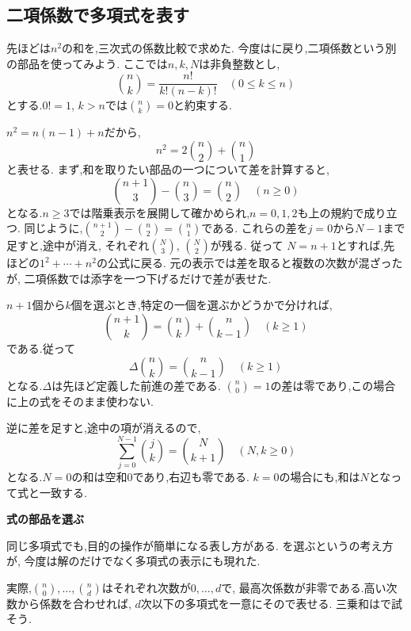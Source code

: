 \subsection{二項係数で多項式を表す}\label{節：二項係数と差分}
  先ほどは$n^2$の和を,三次式の係数比較で求めた.
  今度はに戻り,二項係数という別の部品を使ってみよう.
  ここでは$n,k,N$は非負整数とし,
  \[
    \binom nk=\frac{n!}{k!(n-k)!}\quad(0\le k\le n)
  \]
  とする.$0!=1$, $k>n$では$\binom nk=0$と約束する.

  $n^2=n(n-1)+n$だから,
  \[
    n^2=2\binom n2+\binom n1
  \]
  と表せる.
  まず,和を取りたい部品の一つについて差を計算すると,
  \[
    \binom{n+1}{3}-\binom n3=\binom n2\quad(n\ge0)
  \]
  となる.$n\ge3$では階乗表示を展開して確かめられ,$n=0,1,2$も上の規約で成り立つ.
  同じように,$\binom{n+1}{2}-\binom n2=\binom n1$である.
  これらの差を$j=0$から$N-1$まで足すと,途中が消え,
  それぞれ$\binom N3$, $\binom N2$が残る.
  従って
  \BookMathLayout{\[
    \sum_{j=0}^{N-1}j^2=2\binom N3+\binom N2
     =\frac{N(N-1)(2N-1)}6.
  \]}{\[
    \begin{aligned}
      \sum_{j=0}^{N-1}j^2&=2\binom N3+\binom N2\\
      &=\frac{N(N-1)(2N-1)}6.
    \end{aligned}
  \]}
  $N=n+1$とすれば,先ほどの$1^2+\cdots+n^2$の公式に戻る.
  元の表示では差を取ると複数の次数が混ざったが,
  二項係数では添字を一つ下げるだけで差が表せた.

  $n+1$個から$k$個を選ぶとき,特定の一個を選ぶかどうかで分ければ,
  \[
    \binom{n+1}{k}=\binom nk+\binom n{k-1}\quad(k\ge1)
  \]
  である.従って
  \[
    \Delta\binom nk=\binom n{k-1}\quad(k\ge1)
  \]
  となる.$\Delta$は先ほど定義した前進の差である.
  $\binom n0=1$の差は零であり,この場合に上の式をそのまま使わない.

  逆に差を足すと,途中の項が消えるので,
  \[
    \sum_{j=0}^{N-1}\binom jk=\binom N{k+1}
    \quad(N,k\ge0)
  \]
  となる.$N=0$の和は空和$0$であり,右辺も零である.
  $k=0$の場合にも,和は$N$となって式と一致する.
  \BookFigBinomialDifference

  \begin{bookpoint}
    \textbf{式の部品を選ぶ}\par
    同じ多項式でも,目的の操作が簡単になる表し方がある.
    を選ぶというの考え方が,
    今度は解のだけでなく多項式の表示にも現れた.
  \end{bookpoint}
  実際,$\binom n0,\ldots,\binom nd$はそれぞれ次数が$0,\ldots,d$で,
  最高次係数が非零である.高い次数から係数を合わせれば,
  $d$次以下の多項式を一意にそので表せる.
  三乗和はで試そう.
